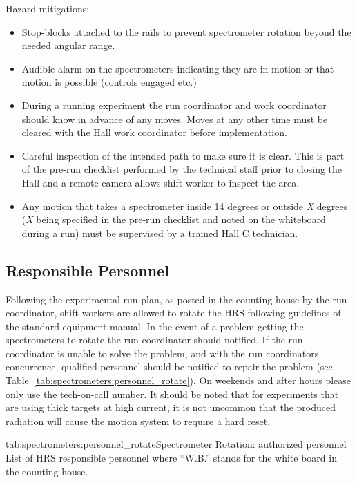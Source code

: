 {\begin{safetyen}{0}{0}
Hazard mitigations:
\begin{itemize}
\item{Stop-blocks attached to the rails to prevent spectrometer rotation beyond the needed angular range.}
\item{Audible alarm on the spectrometers indicating they are in motion or that motion
is possible (controls engaged etc.)}
\item{During a running experiment the run coordinator and work coordinator should know in advance 
of any moves.  Moves at any other time must be cleared with the Hall work coordinator 
before implementation.}
\item{Careful inspection of the intended path to make sure it is clear. This is part of
the pre-run checklist performed by the technical staff prior to closing the Hall and
a remote camera allows shift worker to inspect the area.}
\item{Any motion that takes a spectrometer inside 14 degrees or outside \emph{X} degrees
(\emph{X} being specified in the pre-run checklist and noted on the whiteboard during a run) 
must be supervised by a trained Hall C technician.}
\end{itemize}
\end{safetyen}

\subsection{Responsible Personnel}

Following the experimental run plan, as posted in the counting house
by the run coordinator, shift workers are allowed to rotate the HRS
following guidelines of the standard equipment manual.  In the event
of a problem getting the spectrometers to rotate the run coordinator
should notified.  If the run coordinator is unable to solve the
problem, and with the run coordinators concurrence, qualified
personnel should be notified to repair the problem (see
Table~\ref{tab:spectrometers:personnel_rotate}).  On weekends and after hours
please only use the tech-on-call number.  It should be noted that for
experiments that are using thick targets at high current, it is not
uncommon that the produced radiation will cause the motion system to
require a hard reset.

\begin{namestab}{tab:spectrometers:personnel_rotate}{Spectrometer Rotation: authorized personnel}{%
      List of HRS responsible personnel where ``W.B.'' stands for the white board 
      in the counting house.}
   \MikeFowler{}
   \WalterKellner{}
   \AndyKenyon{}
   \JoeBeaufait{}
\end{namestab}

}
